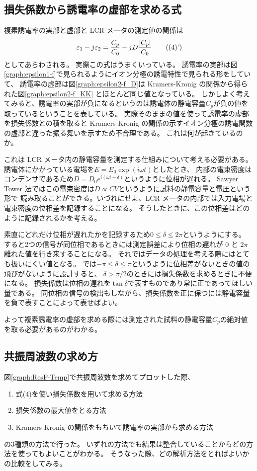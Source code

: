 \documentclass[9pt,dvipdfmx,a4paper]{jsarticle}
\begin{document}
\subsection{損失係数から誘電率の虚部を求める式}
複素誘電率の実部と虚部と LCR メータの測定値の関係は
\begin{align*}
    \varepsilon_1 - j\varepsilon_2 = \frac{C_p}{C_0}-jD\frac{\abs{C_p}}{C_0} \tag{(4)'}
\end{align*}
としてあらわされる。
実際この式はうまくいっている。
誘電率の実部は図\ref{graph:epsilon1-f}で見られるようにイオン分極の誘電特性で見られる形をしていて、
誘電率の虚部は図\ref{graph:epsilon2-f_D}は Kramers-Kronig の関係から得られた図\ref{graph:epsilon2-f_KK}
とほとんど同じ値となっている。
しかしよく考えてみると、誘電率の実部が負になるというのは誘電体の静電容量\(C_p\)が負の値を取っているということを表している。
実際そのままの値を使って誘電率の虚部を損失係数との積を取ると
Kramers-Kronig の関係の示すイオン分極の誘電関数の虚部と違った振る舞いを示すため不合理である。
これは何が起きているのか。

これは LCR メータ内の静電容量を測定する仕組みについて考える必要がある。
誘電体にかかっている電場を\(E=E_0\exp(i\omega t)\)としたとき、
内部の電束密度はコンデンサであるため\(D=D_0e^{i(\omega t - \delta)}\)というように位相が遅れる。
Sawyer Tower 法ではこの電束密度は\(D \propto CV\)というように試料の静電容量と電圧という形で
読み取ることができる。いづれにせよ、LCR メータの内部では入力電場と電束密度の位相差を記録することになる。
そうしたときに、この位相差はどのように記録されるかを考える。

素直にどれだけ位相が遅れたかを記録するため\(0\leq \delta \leq 2\pi\)というようにする。
すると2つの信号が同位相であるときには測定誤差により位相の遅れが 0 と \(2\pi\)離れた値を行き来することになる。
それではデータの処理を考える際にはとても扱いにくい値となる。
では\(-\pi\leq\delta\leq\pi\)というように位相差がないときの値の飛びがないように設計すると、
\(\delta>\pi/2\)のときには損失係数を求めるときに不便になる。
損失係数は位相の遅れを\(\tan \delta\)で表すものであり常に正であってほしい量である。
同位相の信号の検出もしながら、損失係数を正に保つには静電容量を負で表すことによって表せばよい。

よって複素誘電率の虚部を求める際には測定された試料の静電容量\(C_p\)の絶対値を取る必要があるのがわかる。

\subsection{共振周波数の求め方}
図\ref{graph:ResF-Temp}で共振周波数を求めてプロットした際、
\begin{enumerate}
    \item 式(4)を使い損失係数を用いて求める方法
    \item 損失係数の最大値をとる方法
    \item Kramers-Kronig の関係をもちいて誘電率の実部から求める方法
\end{enumerate}
の3種類の方法で行った。
いずれの方法でも結果は整合していることからどの方法を使ってもよいことがわかる。
そうなった際、どの解析方法をとればよいかの比較をしてみる。
\end{document}

